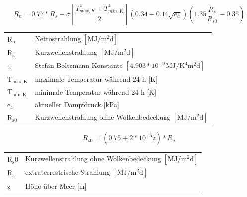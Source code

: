 \begin{appendix}
\begin{description}
\begin{equation}
\label{eq:rn}
R_n=0.77*R_s-\sigma\left[\frac{T_{max,K}^4+T_{min,K}^4}{2}\right]\left(0.34-0.14\sqrt{e_a}\right)\left(1.35\frac{R_s}{R_{s0}}-0.35\right)
\end{equation}
\begin{table}[H]
\centering
\begin{tabular}{ll}
$\mathrm{R_n}$ & Nettostrahlung $\mathrm{[MJ/m^2d]}$ \\
$\mathrm{R_s}$ & Kurzwellenstrahlung $\mathrm{[MJ/m^2d]}$ \\
$\mathrm{\sigma}$ & Stefan Boltzmann Konstante $\mathrm{[4.903*10^{-9}\,MJ/K^4m^2d]}$\\
$\mathrm{T_{max,K}}$ & maximale Temperatur während 24 h [K]\\
$\mathrm{T_{min,K}}$ & minimale Temperatur während 24 h [K]\\
$\mathrm{e_a}$ & aktueller Dampfdruck [kPa]\\
$\mathrm{R_{s0}}$ & Kurzwellenstrahlung ohne Wolkenbedeckung $\mathrm{[MJ/m^2d]}$\\
\end{tabular}
\end{table}

\begin{equation}
\label{eq:rs0}
R_{s0}=\left(0.75+2*10^{-5}z\right)*R_a
\end{equation}
\begin{table}[H]
\centering
\begin{tabular}{ll}
$\mathrm{R_s0}$ & Kurzwellenstrahlung ohne Wolkenbedeckung $\mathrm{[MJ/m^2d]}$\\
$\mathrm{R_a}$ & extraterrestrische Strahlung $\mathrm{[MJ/m^2d]}$ \\
z & Höhe über Meer [m]\\
\end{tabular}
\end{table}


\end{description}
\end{appendix}
